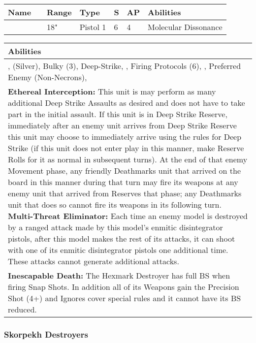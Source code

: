 \noindent
\begin{tabular}{||m{140pt} m{00pt} m{31pt} m{55pt} m{12pt} m{12pt} m{210pt}||}
	\hline
	Name & & Range & Type & S & AP & Abilities \\
	\hline
	\quickref{Enmitic Disintegrator Pistol} &  & 18" & Pistol 1 & 6 & 4 & Molecular Dissonance \\
	\hline
\end{tabular}

\noindent
\begin{tabular}{||m{532pt}||}
	\hline
	Abilities \\
	\hline
	\quickref{Annihilation Protocols}, \quickref{Awakening Protocols} (Silver), Bulky (3), Deep-Strike, \quickref{Hyperspace Hunters}, Firing Protocols (6), \quickref{Living Metal}, Preferred Enemy (Non-Necrons), \quickref{Reanimation Protocols} \\
	\textbf{Ethereal Interception:} This unit is may perform as many additional Deep Strike Assaults as desired and does not have to take part in the initial assault. If this unit is in Deep Strike Reserve, immediately after an enemy unit arrives from Deep Strike Reserve this unit may choose to immediately arrive using the rules for Deep Strike (if this unit does not enter play in this manner, make Reserve Rolls for it as normal in subsequent turns). At the end of that enemy Movement phase, any friendly Deathmarks unit that arrived on the board in this manner during that turn may fire its weapons at any enemy unit that arrived from Reserves that phase; any Deathmarks unit that does so cannot fire its weapons in its following turn.
	\textbf{Multi-Threat Eliminator:} Each time an enemy model is destroyed by a ranged attack made by this model's enmitic disintegrator pistols, after this model makes the rest of its attacks, it can shoot with one of its enmitic disintegrator pistols one additional time. These attacks cannot generate additional attacks. \\
	\textbf{Inescapable Death:} The Hexmark Destroyer has full BS when firing Snap Shots. In addition all of its Weapons gain the Precision Shot (4+) and Ignores cover special rules and it cannot have its BS reduced. \\
	\hline
\end{tabular}

\newpage
\subsubsection{Skorpekh Destroyers}

